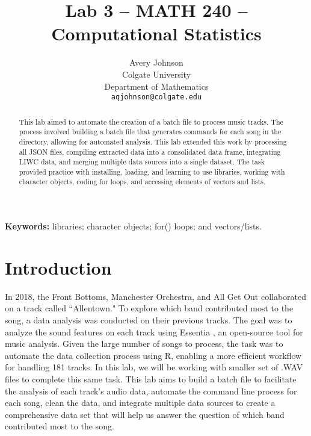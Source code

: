 \documentclass{article}\usepackage[]{graphicx}\usepackage[]{xcolor}
\begin{document}
\vspace{-1in}
\title{Lab 3 -- MATH 240 -- Computational Statistics}

\author{
  Avery Johnson \\
  Colgate University  \\
  Department of Mathematics  \\
  {\tt aqjohnson@colgate.edu}
}

\date{}

\maketitle

\begin{multicols}{2}
\begin{abstract}
This lab aimed to automate the creation of a batch file to process music tracks. The process involved building a batch file that generates commands for each song in the directory, allowing for automated analysis. This lab extended this work by processing all JSON files, compiling extracted data into a consolidated data frame, integrating LIWC data, and merging multiple data sources into a single dataset. The task provided practice with installing, loading, and learning to use libraries, working with character objects, coding for loops, and accessing elements of vectors and lists. 

\end{abstract}

\noindent \textbf{Keywords:} libraries; character objects; for() loops; and vectors/lists.

\section{Introduction}

In 2018, the Front Bottoms, Manchester Orchestra, and All Get Out collaborated on a track called ``Allentown." To explore which band contributed most to the song, a data analysis was conducted on their previous tracks. The goal was to analyze the sound features on each track using Essentia \citep{essentia}, an open-source tool for music analysis. Given the large number of songs to process, the task was to automate the data collection process using R, enabling a more efficient workflow for handling 181 tracks. In this lab, we will be working with smaller set of .WAV files to complete this same task. This lab aims to build a batch file to facilitate the analysis of each track's audio data, automate the command line process for each song, clean the data, and integrate multiple data sources to create a comprehensive data set that will help us answer the question of which band contributed most to the song.



\end{multicols}
\end{document}
